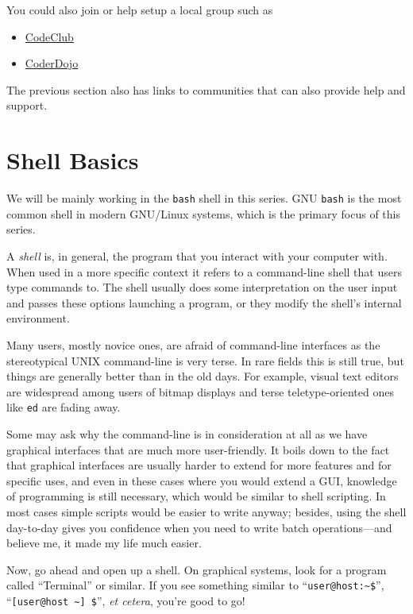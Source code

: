 \documentclass{extbook}
\begin{document}
You could also join or help setup a local group such as

\begin{itemize}
\item \href{https://www.codeclub.org.uk}{CodeClub}
\item \href{https://coderdojo.com/}{CoderDojo}
\end{itemize}

The previous section also has links to communities that can also provide help and support.


\chapter{Shell Basics}

We will be mainly working in the \texttt{bash} shell in this series. GNU \texttt{bash} is the most common shell in modern GNU/Linux systems, which is the primary focus of this series.

A \textit{shell} is, in general, the program that you interact with your computer with. When used in a more specific context it refers to a command-line shell that users type commands to. The shell usually does some interpretation on the user input and passes these options launching a program, or they modify the shell's internal environment.

Many users, mostly novice ones, are afraid of command-line interfaces as the stereotypical UNIX command-line is very terse. In rare fields this is still true, but things are generally better than in the old days. For example, visual text editors are widespread among users of bitmap displays and terse teletype-oriented ones like \texttt{ed} are fading away.

Some may ask why the command-line is in consideration at all as we have graphical interfaces that are much more user-friendly. It boils down to the fact that graphical interfaces are usually harder to extend for more features and for specific uses, and even in these cases where you would extend a GUI, knowledge of programming is still necessary, which would be similar to shell scripting. In most cases simple scripts would be easier to write anyway; besides, using the shell day-to-day gives you confidence when you need to write batch operations---and believe me, it made my life much easier.

Now, go ahead and open up a shell. On graphical systems, look for a program called ``Terminal'' or similar. If you see something similar to ``\verb|user@host:~$|'', ``\verb|[user@host ~] $|'', \textit{et cetera}, you're good to go!
\end{document}
